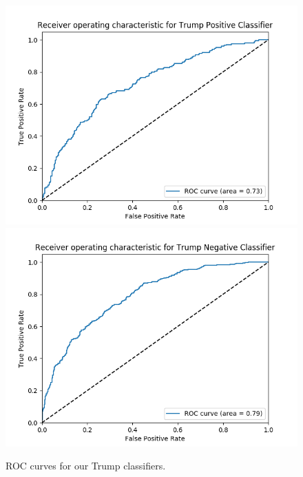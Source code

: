 \documentclass[12pt]{article}
\begin{document}
\begin{figure}[H]
                  \includegraphics[width=\linewidth]{TrumpPositiveClassifier.png}
        \endminipage\hfill
                  \includegraphics[width=\linewidth]{TrumpNegativeClassifier.png}
        \endminipage
        \caption{ROC curves for our Trump classifiers.}
\end{figure}
\end{document}
